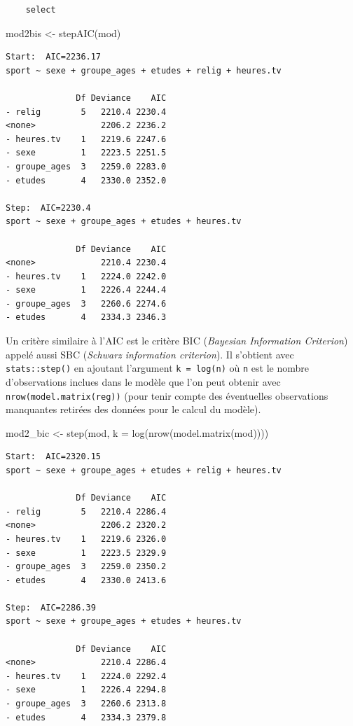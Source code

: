 \documentclass[
  letterpaper,
  DIV=11,
  numbers=noendperiod,
  oneside]{scrreprt}
\newenvironment{Shaded}{\begin{snugshade}}{\end{snugshade}}
\newcommand{\AttributeTok}[1]{\textcolor[rgb]{0.40,0.45,0.13}{#1}}
\newcommand{\FunctionTok}[1]{\textcolor[rgb]{0.28,0.35,0.67}{#1}}
\newcommand{\NormalTok}[1]{\textcolor[rgb]{0.00,0.23,0.31}{#1}}
\newcommand{\OtherTok}[1]{\textcolor[rgb]{0.00,0.23,0.31}{#1}}
\begin{document}
\begin{tcolorbox}
\begin{verbatim}
    select
\end{verbatim}

\begin{Shaded}
\begin{Highlighting}[]
\NormalTok{mod2bis }\OtherTok{\textless{}{-}} \FunctionTok{stepAIC}\NormalTok{(mod)}
\end{Highlighting}
\end{Shaded}

\begin{verbatim}
Start:  AIC=2236.17
sport ~ sexe + groupe_ages + etudes + relig + heures.tv

              Df Deviance    AIC
- relig        5   2210.4 2230.4
<none>             2206.2 2236.2
- heures.tv    1   2219.6 2247.6
- sexe         1   2223.5 2251.5
- groupe_ages  3   2259.0 2283.0
- etudes       4   2330.0 2352.0

Step:  AIC=2230.4
sport ~ sexe + groupe_ages + etudes + heures.tv

              Df Deviance    AIC
<none>             2210.4 2230.4
- heures.tv    1   2224.0 2242.0
- sexe         1   2226.4 2244.4
- groupe_ages  3   2260.6 2274.6
- etudes       4   2334.3 2346.3
\end{verbatim}

Un critère similaire à l'AIC est le critère BIC (\emph{Bayesian
Information Criterion}) appelé aussi SBC (\emph{Schwarz information
criterion}). Il s'obtient avec \texttt{stats::step()} en ajoutant
l'argument \texttt{k\ =\ log(n)} où \texttt{n} est le nombre
d'observations inclues dans le modèle que l'on peut obtenir avec
\texttt{nrow(model.matrix(reg))} (pour tenir compte des éventuelles
observations manquantes retirées des données pour le calcul du modèle).

\begin{Shaded}
\begin{Highlighting}[]
\NormalTok{mod2\_bic }\OtherTok{\textless{}{-}} \FunctionTok{step}\NormalTok{(mod, }\AttributeTok{k =} \FunctionTok{log}\NormalTok{(}\FunctionTok{nrow}\NormalTok{(}\FunctionTok{model.matrix}\NormalTok{(mod))))}
\end{Highlighting}
\end{Shaded}

\begin{verbatim}
Start:  AIC=2320.15
sport ~ sexe + groupe_ages + etudes + relig + heures.tv

              Df Deviance    AIC
- relig        5   2210.4 2286.4
<none>             2206.2 2320.2
- heures.tv    1   2219.6 2326.0
- sexe         1   2223.5 2329.9
- groupe_ages  3   2259.0 2350.2
- etudes       4   2330.0 2413.6

Step:  AIC=2286.39
sport ~ sexe + groupe_ages + etudes + heures.tv

              Df Deviance    AIC
<none>             2210.4 2286.4
- heures.tv    1   2224.0 2292.4
- sexe         1   2226.4 2294.8
- groupe_ages  3   2260.6 2313.8
- etudes       4   2334.3 2379.8
\end{verbatim}

\end{tcolorbox}
\end{document}
